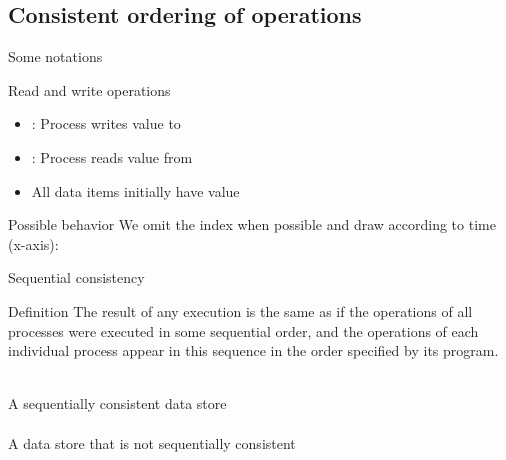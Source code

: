 \subsection{Consistent ordering of operations}
\begin{slide}{Some notations}
  \begin{block}{Read and write operations}
    \begin{itemize}
    \item {}: Process  writes value  to 
    \item {}: Process  reads value  from 
    \item All data items initially have value 
    \end{itemize}
  \end{block}

  \begin{block}{Possible behavior}
    We omit the index when possible and draw according to time (x-axis):

    \vspace*{12pt}
    \begin{centerfig}
    \end{centerfig}
  \end{block}
\end{slide}
\begin{slide}{Sequential consistency}
  \begin{block}{Definition}
    The result of any execution is the same as if the operations of all processes were executed in some
    sequential order, and the operations of each individual process appear in this sequence in the order
    specified by its program.
  \end{block}
  \vspace*{-6pt}
  \begin{centerfig}
     \\
    A sequentially consistent data store \\
    \vspace*{12pt}
     \\
    A data store that is not sequentially consistent
  \end{centerfig}
\end{slide}
